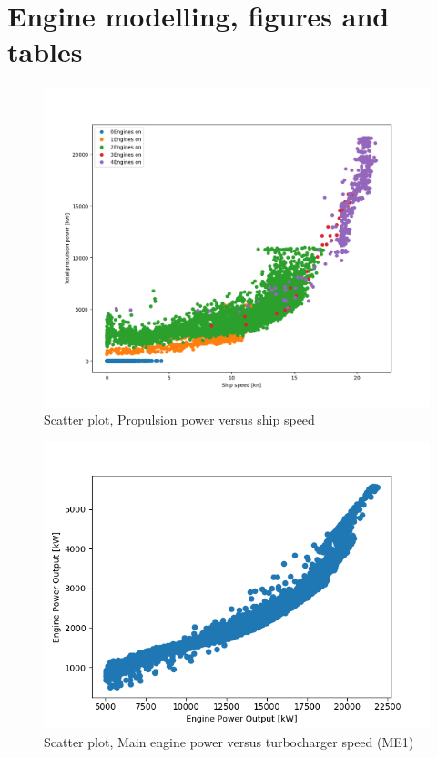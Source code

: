 \documentclass[preprint,12pt]{elsarticle}
\begin{document}
  















\appendix

\section{Engine modelling, figures and tables} \label{sec:appendix:engines}



\begin{figure}
	\centering
	\includegraphics[width=0.9\linewidth]{Figures/Pme_vs_vship_Neng}
	\caption{Scatter plot, Propulsion power versus ship speed}
	\label{fig:Pme_vs_vship_Neng}
\end{figure}

\begin{figure}
	\centering
	\includegraphics[width=0.9\linewidth]{Figures/Scatter_Pme_vs_TCspeed}
	\caption{Scatter plot, Main engine power versus turbocharger speed (ME1)}
	\label{fig:Pme_vs_TCspeed}
\end{figure}
\end{document}
